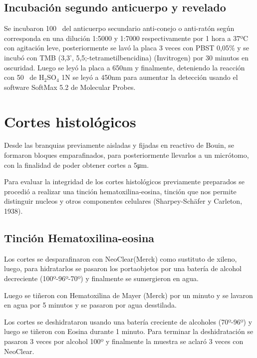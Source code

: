 \documentclass[12pt,letterpaper,oneside]{scrbook}
\newcommand{\subindice}[1]{$_{\text{#1}}$}
\begin{document}
\subsection{Incubación segundo anticuerpo y revelado}

Se incubaron 100\si{\micro\litro} del anticuerpo secundario anti-conejo
o anti-ratón según corresponda en una dilución 1:5000 y 1:7000
respectivamente por 1 hora a 37ºC con agitación leve, posteriormente se
lavó la placa 3 veces con PBST 0,05\% y se incubó con TMB (3,3',
5,5;-tetrametilbencidina) (Invitrogen) por 30 minutos en oscuridad.
Luego se leyó la placa a 650nm y finalmente, deteniendo la reacción con
50\si{\micro\litro} de H\subindice{2}SO\subindice{4} 1N se leyó a 450nm
para aumentar la detección usando el software SoftMax 5.2 de Molecular
Probes.

\section{Cortes histológicos}

Desde las branquias previamente aisladas y fijadas en reactivo de Bouin,
se formaron bloques emparafinados, para posteriormente llevarlos a un
micrótomo, con la finalidad de poder obtener cortes a
5\si{\micro\meter}.

Para evaluar la integridad de los cortes histológicos previamente
preparados se procedió a realizar una tinción hematoxilina-eosina,
tinción que nos permite distinguir nucleos y otros componentes celulares
(Sharpey-Schäfer y Carleton, 1938).

\subsection{Tinción Hematoxilina-eosina}

Los cortes se desparafinaron con NeoClear\textregistered (Merck) como
sustituto de xileno, luego, para hidratarlos se pasaron los portaobjetos
por una batería de alcohol decreciente (100º-96º-70º) y finalmente se
sumergieron en agua.

Luego se tiñeron con Hematoxilina de Mayer (Merck) por un minuto y se
lavaron en agua por 5 minutos y se pasaron por agua desstilada.

Los cortes se deshidrataron usando una batería creciente de alcoholes
(70º-96º) y luego se tiñeron con Eosina durante 1 minuto. Para terminar
la deshidratación se pasaron 3 veces por alcohol 100º y finalmente la
muestra se aclaró 3 veces con NeoClear\textregistered.
\end{document}
